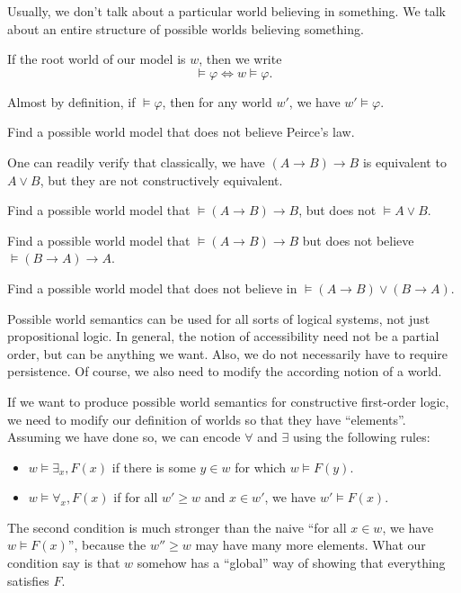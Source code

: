\documentclass[a4paper]{article}
\begin{document}
Usually, we don't talk about a particular world believing in something. We talk about an entire structure of possible worlds believing something.
\begin{notation}
  If the root world of our model is $w$, then we write
  \[
    \vDash \varphi \Longleftrightarrow w \vDash \varphi.
  \]
\end{notation}
Almost by definition, if $\vDash \varphi$, then for any world $w'$, we have $w' \vDash \varphi$.

\begin{ex}
  Find a possible world model that does not believe Peirce's law.
\end{ex}

One can readily verify that classically, we have $(A \to B) \to B$ is equivalent to $A \vee B$, but they are not constructively equivalent.
\begin{ex}
  Find a possible world model that $\vDash (A \to B) \to B$, but does not $\vDash A \vee B$.
\end{ex}

\begin{ex}
  Find a possible world model that $\vDash (A \to B) \to B$ but does not believe $\vDash (B \to A) \to A$.
\end{ex}

\begin{ex}
  Find a possible world model that does not believe in $\vDash (A \to B) \vee (B \to A)$.
\end{ex}

Possible world semantics can be used for all sorts of logical systems, not just propositional logic. In general, the notion of accessibility need not be a partial order, but can be anything we want. Also, we do not necessarily have to require persistence. Of course, we also need to modify the according notion of a world.

\begin{eg}
  If we want to produce possible world semantics for constructive first-order logic, we need to modify our definition of worlds so that they have ``elements''. Assuming we have done so, we can encode $\forall$ and $\exists$ using the following rules:
  \begin{itemize}
    \item $w \vDash \exists_x, F(x)$ if there is some $y \in w$ for which $w \vDash F(y)$.
    \item $w \vDash \forall_x, F(x)$ if for all $w' \geq w$ and $x \in w'$, we have $w' \vDash F(x)$.
  \end{itemize}
  The second condition is much stronger than the naive ``for all $x \in w$, we have $w \vDash F(x)$'', because the $w'' \geq w$ may have many more elements. What our condition say is that $w$ somehow has a ``global'' way of showing that everything satisfies $F$.
\end{eg}
\end{document}
